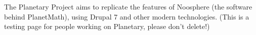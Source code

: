 \documentclass[12pt]{article}
\begin{document}
The Planetary Project aims to replicate the features of Noosphere (the software behind PlanetMath), using Drupal 7 and other modern technologies.  (This is a testing page for people working on Planetary, please don't delete!)

\end{document}

